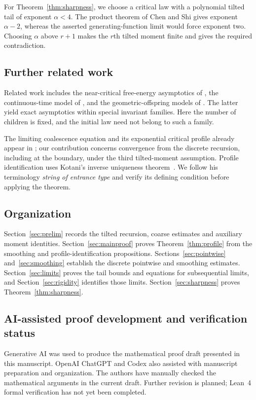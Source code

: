 \documentclass[11pt,letterpaper,reqno]{amsart}
\theoremstyle{plain}
\begin{document}
For Theorem~\ref{thm:sharpness}, we choose a critical law with a polynomial tilted tail of exponent $\alpha<4$. The product theorem of Chen and Shi gives exponent $\alpha-2$, whereas the asserted generating-function limit would force exponent two. Choosing $\alpha$ above $r+1$ makes the $r$th tilted moment finite and gives the required contradiction.

\subsection{Further related work}
Related work includes the near-critical free-energy asymptotics
of \cite{CDDHLS}, the continuous-time model of \cite{HMP}, and the
geometric-offspring models of \cite{LZ,AHM}. The latter yield exact
asymptotics within special invariant families. Here the number of
children is fixed, and the initial law need not belong to such a family.

The limiting coalescence equation and its exponential critical profile
already appear in \cite{CDDS}; our contribution concerns convergence
from the discrete recursion, including at the boundary, under the third
tilted-moment assumption. Profile identification uses Kotani's inverse
uniqueness theorem~\cite{Kotani}. We follow his terminology
\emph{string of entrance type} and verify its defining condition
\cite[Section~2, condition~(2.1)]{Kotani} before applying the theorem.

\subsection{Organization}
Section~\ref{sec:prelim} records the tilted recursion, coarse estimates and auxiliary moment identities. Section~\ref{sec:mainproof} proves Theorem~\ref{thm:profile} from the smoothing and profile-identification propositions. Sections~\ref{sec:pointwise} and~\ref{sec:smoothing} establish the discrete pointwise and smoothing estimates. Section~\ref{sec:limits} proves the tail bounds and equations for subsequential limits, and Section~\ref{sec:rigidity} identifies those limits. Section~\ref{sec:sharpness} proves Theorem~\ref{thm:sharpness}.

\subsection{AI-assisted proof development and verification status}
\label{subsec:ai-declaration}

Generative AI was used to produce the mathematical proof draft presented
in this manuscript. OpenAI ChatGPT and Codex also assisted with manuscript
preparation and organization. The authors have manually checked the
mathematical arguments in the current draft. Further revision is planned;
Lean~4 formal verification has not yet been completed.
\end{document}
